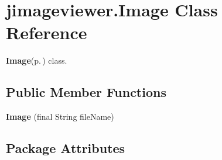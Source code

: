 \section{jimageviewer.Image Class Reference}
\label{classjimageviewer_1_1_image}
{\bf Image}{\rm (p.\,\pageref{classjimageviewer_1_1_image})} class.  


\subsection*{Public Member Functions}
\begin{CompactItemize}
\item 
{\bf Image} (final String file\-Name)
\end{CompactItemize}
\subsection*{Package Attributes}
